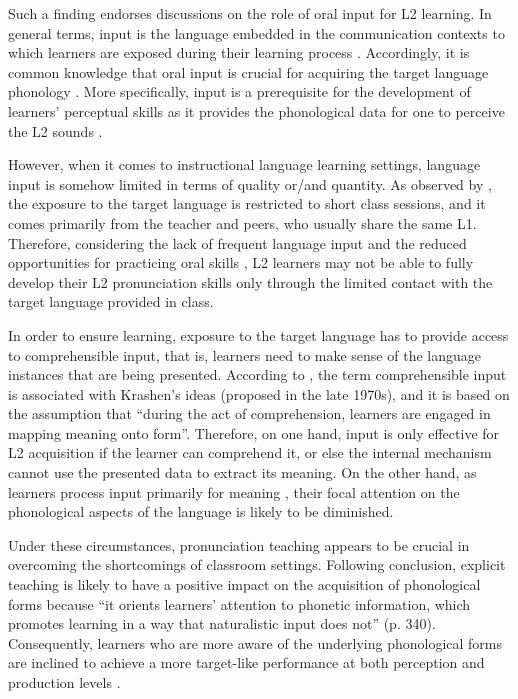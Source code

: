 \documentclass[english]{textolivre}
\begin{document}
Such a finding endorses discussions on the role of oral input for L2 learning. In general terms, input is the language embedded in the communication contexts to which learners are exposed during their learning process \cite{vanpatten2019}. Accordingly, it is common knowledge that oral input is crucial for acquiring the target language phonology \cite{tyler2019}. More specifically, input is a prerequisite for the development of learners’ perceptual skills as it provides the phonological data for one to perceive the L2 sounds \cite{liakin2017, tyler2019}.

However, when it comes to instructional language learning settings, language input is somehow limited in terms of quality or/and quantity. As observed by \textcite{munoz2008}, the exposure to the target language is restricted to short class sessions, and it comes primarily from the teacher and peers, who usually share the same L1. Therefore, considering the lack of frequent language input and the reduced opportunities for practicing oral skills \cite{carlet_improving_2018}, L2 learners may not be able to fully develop their L2 pronunciation skills only through the limited contact with the target language provided in class.

In order to ensure learning, exposure to the target language has to provide access to comprehensible input, that is, learners need to make sense of the language instances that are being presented. According to \textcite[p. 46]{vanpatten2019}, the term comprehensible input is associated with Krashen’s ideas (proposed in the late 1970s), and it is based on the assumption that “during the act of comprehension, learners are engaged in mapping meaning onto form”. Therefore, on one hand, input is only effective for L2 acquisition if the learner can comprehend it, or else the internal mechanism cannot use the presented data to extract its meaning. On the other hand, as learners process input primarily for meaning \cite{vanpatten2008}, their focal attention on the phonological aspects of the language is likely to be diminished.

Under these circumstances, pronunciation teaching appears to be crucial in overcoming the shortcomings of classroom settings. Following \textcite{thomson2015} conclusion, explicit teaching is likely to have a positive impact on the acquisition of phonological forms because “it orients learners’ attention to phonetic information, which promotes learning in a way that naturalistic input does not” (p. 340). Consequently, learners who are more aware of the underlying phonological forms are inclined to achieve a more target-like performance at both perception and production levels \cite{carlet_improving_2018}.
\end{document}
